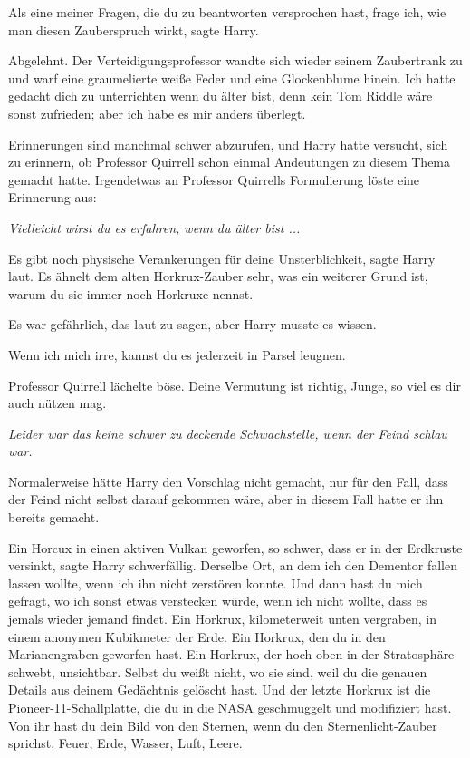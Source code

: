 \glqq{}Als eine meiner Fragen, die du zu beantworten versprochen hast, frage ich,
wie man diesen Zauberspruch wirkt\grqq{}, sagte Harry.

\glqq{}Abgelehnt.\grqq{} Der Verteidigungsprofessor wandte sich wieder seinem
Zaubertrank zu und warf eine graumelierte weiße Feder und eine Glockenblume
hinein. \glqq{}Ich hatte gedacht dich zu unterrichten wenn du älter bist, denn
kein Tom Riddle wäre sonst zufrieden; aber ich habe es mir anders
überlegt.\grqq{}

Erinnerungen sind manchmal schwer abzurufen, und Harry hatte versucht, sich zu
erinnern, ob Professor Quirrell schon einmal Andeutungen zu diesem Thema gemacht
hatte. Irgendetwas an Professor Quirrells Formulierung löste eine Erinnerung
aus:

\emph{Vielleicht wirst du es erfahren, wenn du älter bist ...}

\glqq{}Es gibt noch physische Verankerungen für deine Unsterblichkeit\grqq{},
sagte Harry laut. \glqq{}Es ähnelt dem alten Horkrux-Zauber sehr, was ein
weiterer Grund ist, warum du sie immer noch Horkruxe nennst.\grqq{}

Es war gefährlich, das laut zu sagen, aber Harry musste es wissen.

\glqq{}Wenn ich mich irre, kannst du es jederzeit in Parsel leugnen.\grqq{}

Professor Quirrell lächelte böse. \glqq{}Deine Vermutung ist richtig, Junge, so
viel es dir auch nützen mag.\grqq{}

\emph{Leider war das keine schwer zu deckende Schwachstelle, wenn der Feind
schlau war.}

Normalerweise hätte Harry den Vorschlag nicht gemacht, nur für den Fall, dass
der Feind nicht selbst darauf gekommen wäre, aber in diesem Fall hatte er ihn
bereits gemacht.

\glqq{}Ein Horcux in einen aktiven Vulkan geworfen, so schwer, dass er in der
Erdkruste versinkt\grqq{}, sagte Harry schwerfällig. \glqq{}Derselbe Ort, an dem
ich den Dementor fallen lassen wollte, wenn ich ihn nicht zerstören konnte. Und
dann hast du mich gefragt, wo ich sonst etwas verstecken würde, wenn ich nicht
wollte, dass es jemals wieder jemand findet. Ein Horkrux, kilometerweit unten
vergraben, in einem anonymen Kubikmeter der Erde. Ein Horkrux, den du in den
Marianengraben geworfen hast. Ein Horkrux, der hoch oben in der Stratosphäre
schwebt, unsichtbar. Selbst du weißt nicht, wo sie sind, weil du die genauen
Details aus deinem Gedächtnis gelöscht hast. Und der letzte Horkrux ist die
Pioneer-11-Schallplatte, die du in die NASA geschmuggelt und modifiziert hast.
Von ihr hast du dein Bild von den Sternen, wenn du den Sternenlicht-Zauber
sprichst. Feuer, Erde, Wasser, Luft, Leere.\grqq{}

